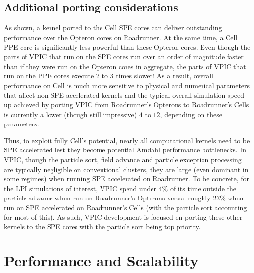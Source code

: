 \documentclass[journal,twoside]{IEEEtran}
\begin{document}
\subsection{Additional porting considerations}

As shown, a kernel ported to the Cell SPE cores can deliver
outstanding performance over the Opteron cores on Roadrunner.  At the
same time, a Cell PPE core is significantly less powerful than these
Opteron cores.  Even though the parts of VPIC that run on the SPE
cores run over an order of magnitude faster than if they were run on
the Opteron cores in aggregate, the parts of VPIC that run on the PPE
cores execute $2$ to $3$ times slower!  As a result, overall
performance on Cell is much more sensitive to physical and numerical
parameters that affect non-SPE accelerated kernels and the typical
overall simulation speed up achieved by porting VPIC from Roadrunner's
Opterons to Roadrunner's Cells is currently a lower (though still
impressive) $4$ to $12$, depending on these parameters.

Thus, to exploit fully Cell's potential, nearly all computational
kernels need to be SPE accelerated lest they become potential Amdahl
performance bottlenecks.  In VPIC, though the particle sort, field
advance and particle exception processing are typically negligible on
conventional clusters, they are large (even dominant in some regimes)
when running SPE accelerated on Roadrunner.  To be concrete, for the
LPI simulations of interest, VPIC spend under $4\%$ of its time
outside the particle advance when run on Roadrunner's Opterons versus
roughly $23\%$ when run on SPE accelerated on Roadrunner's Cells (with
the particle sort accounting for most of this).  As such, VPIC
development is focused on porting these other kernels to the SPE cores
with the particle sort being top priority.

\section{Performance and Scalability} \label{sec:performance}
\end{document}
